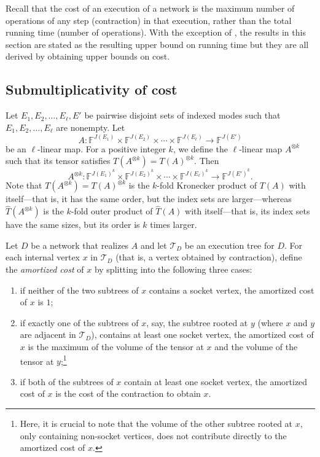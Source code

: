 \documentclass{toc}
\newcommand{\F}{\ensuremath{\mathbb{F}}}
\newcommand{\td}{\ensuremath{\mathcal{T}_D}}
\begin{document}
Recall that the cost of an execution of a network is the maximum
number of operations of any step (contraction) in that execution,
rather than the total running time (number of operations).  With the
exception of , the results in
this section are stated as the resulting upper bound on running time
but they are all derived by obtaining upper bounds on cost.

\subsection{Submultiplicativity of cost}
\label{sec:submultiplicativity}

Let $E_1,E_2,\ldots,E_\ell,E'$ be pairwise disjoint sets of indexed modes
such that $E_1,E_2,\ldots,E_\ell$ are nonempty. Let
\[
A:\F^{J(E_1)}\times\F^{J(E_2)}\times\cdots \times\F^{J(E_\ell)}
      \rightarrow \F^{J(E')}
\]
be an $\ell$-linear map.
For a positive integer $k$, we
define the $\ell$-linear map $A^{\otimes k}$ such that its tensor satisfies $T(A^{\otimes k})=T(A)^{\otimes k}$.  Then
\[
A^{\otimes k}:\F^{J(E_1)^k}\times\F^{J(E_2)^k}\times\cdots \times\F^{J(E_\ell)^k}
      \rightarrow \F^{J(E')^k}.
\]
Note that $T(A^{\otimes k}) = T(A)^{\otimes k}$ is the $k$-fold
Kronecker product of $T(A)$ with itself---that is, it has the same order,
but the index sets are larger---whereas $\hat{T}(A^{\otimes k})$ is
the $k$-fold outer product of $\hat{T}(A)$ with itself---that is, its
index sets have the same sizes, but its order is $k$ times larger.

Let $D$ be a network that realizes $A$ and let $\td$ be an execution
tree for $D$.
For each internal vertex $x$ in $\td$ (that is, a vertex obtained by contraction),
define the \emph{amortized cost} of $x$ by splitting into the following
three cases:
\begin{enumerate}%
\item
if neither of the two subtrees of $x$ contains a socket vertex,
the amortized cost of $x$ is $1$;
\item
if exactly one of the subtrees of $x$,
say, the subtree rooted at $y$ (where $x$ and $y$ are adjacent in $\td$),
contains at least one socket vertex, the amortized cost of
$x$ is the maximum of the volume of the tensor at $x$ and the volume of
the tensor at $y$;\footnote{Here, it is crucial to note that the volume of the other subtree rooted at $x$, only containing non-socket vertices, does not contribute directly to the amortized cost of $x$.}
\item
if both of the subtrees of $x$ contain at
least one socket vertex, the amortized cost of $x$ is the
cost of the contraction to obtain $x$.
\end{enumerate}
\end{document}
